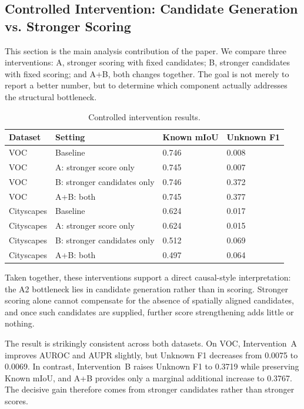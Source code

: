 \documentclass[a4paper,fleqn]{cas-dc}
\begin{document}
\subsection{Controlled Intervention: Candidate Generation vs. Stronger Scoring}
\label{sec:exp:intervention}

This section is the main analysis contribution of the paper. We compare three interventions: A, stronger scoring with fixed candidates; B, stronger candidates with fixed scoring; and A+B, both changes together. The goal is not merely to report a better number, but to determine which component actually addresses the structural bottleneck.

\begin{table}[!htbp]
  \caption{Controlled intervention results.}
  \label{tab:intervention}
  \centering
  \begin{tabular}{llll}
    \toprule
    Dataset & Setting & Known mIoU & Unknown F1 \\
    \midrule
    VOC & Baseline & 0.746 & 0.008 \\
    VOC & A: stronger score only & 0.745 & 0.007 \\
    VOC & B: stronger candidates only & 0.746 & 0.372 \\
    VOC & A+B: both & 0.745 & 0.377 \\
    Cityscapes & Baseline & 0.624 & 0.017 \\
    Cityscapes & A: stronger score only & 0.624 & 0.015 \\
    Cityscapes & B: stronger candidates only & 0.512 & 0.069 \\
    Cityscapes & A+B: both & 0.497 & 0.064 \\
    \bottomrule
  \end{tabular}
\end{table}

Taken together, these interventions support a direct causal-style interpretation: the A2 bottleneck lies in candidate generation rather than in scoring. Stronger scoring alone cannot compensate for the absence of spatially aligned candidates, and once such candidates are supplied, further score strengthening adds little or nothing.

The result is strikingly consistent across both datasets. On VOC, Intervention~A improves AUROC and AUPR slightly, but Unknown F1 decreases from 0.0075 to 0.0069. In contrast, Intervention~B raises Unknown F1 to 0.3719 while preserving Known mIoU, and A+B provides only a marginal additional increase to 0.3767. The decisive gain therefore comes from stronger candidates rather than stronger scores.
\end{document}
